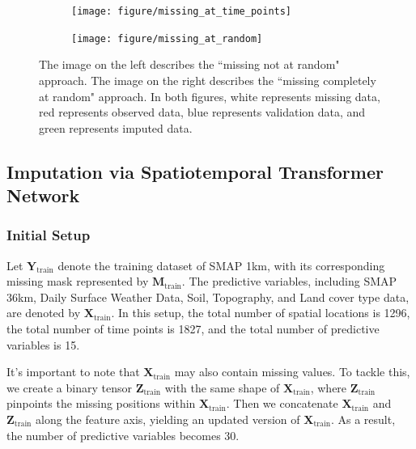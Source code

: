 \documentclass[11pt]{article}
\begin{document}
\begin{figure}[H]
     \centering
      \begin{subfigure}[b]{0.45\textwidth}
		\centering
		\texttt{[image: figure/missing\_at\_time\_points]}
		\caption{}
		\label{fig: missing at time points}
	 \end{subfigure}
         \hfill
      \begin{subfigure}[b]{0.45\textwidth}
         \texttt{[image: figure/missing\_at\_random]}
		 \caption{}
	\label{fig: missing at random}
     \end{subfigure}
    
     \caption{The image on the left describes the ``missing not at random" approach. The image on the right describes the ``missing completely at random" approach. In both figures, white represents missing data, red represents observed data, blue represents validation data, and green represents imputed data.}
     \label{fig: missing pattern}
\end{figure}






\subsection{Imputation via Spatiotemporal Transformer Network}\label{sec: Imputation via Spatiotemporal Transformer Network}

\subsubsection*{Initial Setup}\label{sec: Model Training Setup}

Let $\boldsymbol{Y}_{\text{train}}$ denote the training dataset of SMAP 1km, with its corresponding missing mask represented by $\boldsymbol{M}_{\text{train}}$. The predictive variables, including SMAP 36km, Daily Surface Weather Data, Soil, Topography, and Land cover type data, are denoted by $\boldsymbol{X}_{\text{train}}$. In this setup, the total number of spatial locations is 1296, the total number of time points is 1827, and the total number of predictive variables is 15.


It's important to note that $\boldsymbol{X}_{\text{train}}$ may also contain missing values. To tackle this, we create a binary tensor $\boldsymbol{Z}_{\text{train}}$ with the same shape of $\boldsymbol{X}_{\text{train}}$, where $\boldsymbol{Z}_{\text{train}}$ pinpoints the missing positions within $\boldsymbol{X}_{\text{train}}$. Then we concatenate $\boldsymbol{X}_{\text{train}}$ and $\boldsymbol{Z}_{\text{train}}$ along the feature axis, yielding an updated version of $\boldsymbol{X}_{\text{train}}$. As a result, the number of predictive variables becomes 30.
\end{document}
